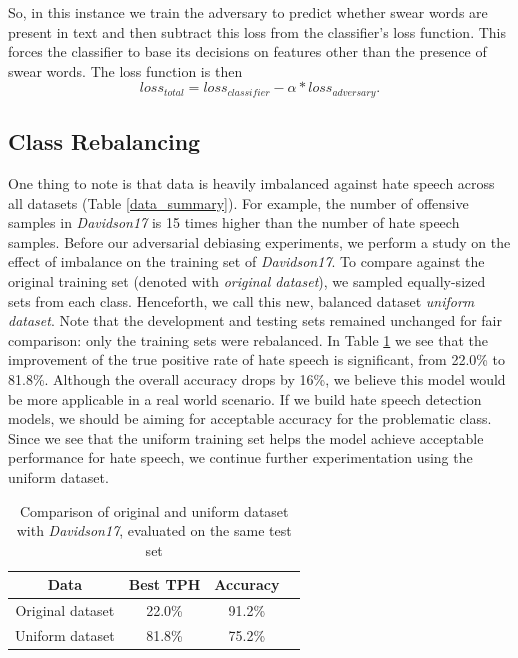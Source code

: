 \documentclass[11pt]{article}
\begin{document}
	So, in this instance we train the adversary to predict whether swear words are present in text and then subtract this loss from the classifier's loss function. This forces the classifier to base its decisions on features other than the presence of swear words. The loss function is then
	$$loss_{total}=loss_{classifier}-\alpha*loss_{adversary}.$$
	
	
	
	\subsection{Class Rebalancing}
	
	One thing to note is that data is heavily imbalanced against hate speech across all datasets (Table \ref{data_summary}). For example, the number of offensive samples in \textit{Davidson17} is 15 times higher than the number of hate speech samples. Before our adversarial debiasing experiments, we perform a study on the effect of imbalance on the training set of \textit{Davidson17}. To compare against the original training set (denoted with \textit{original dataset}), we sampled equally-sized sets from each class. Henceforth, we call this new, balanced dataset \textit{uniform dataset}. Note that the development and testing sets remained unchanged for fair comparison: only the training sets were rebalanced. In Table \ref{Davidson_comparison} we see that the improvement of the true positive rate of hate speech is significant, from 22.0\% to 81.8\%. Although the overall accuracy drops by 16\%, we believe this model would be more applicable in a real world scenario. If we build hate speech detection models, we should be aiming for acceptable accuracy for the problematic class. Since we see that the uniform training set helps the model achieve acceptable performance for hate speech, we continue further experimentation using the uniform dataset.
	
	\begin{table}[h]
		\centering
		\small
		\begin{tabular}{|c|c|c|c|}
			\hline Data & Best TPH & Accuracy \\ \hline
			Original dataset &  22.0\% & 91.2\% \\\hline
			Uniform dataset  & 81.8\% & 75.2\% \\\hline
		\end{tabular}
		\caption{Comparison of original and uniform dataset with \textit{Davidson17}, evaluated on the same test set\label{Davidson_comparison}}
	\end{table}
	
\end{document}
